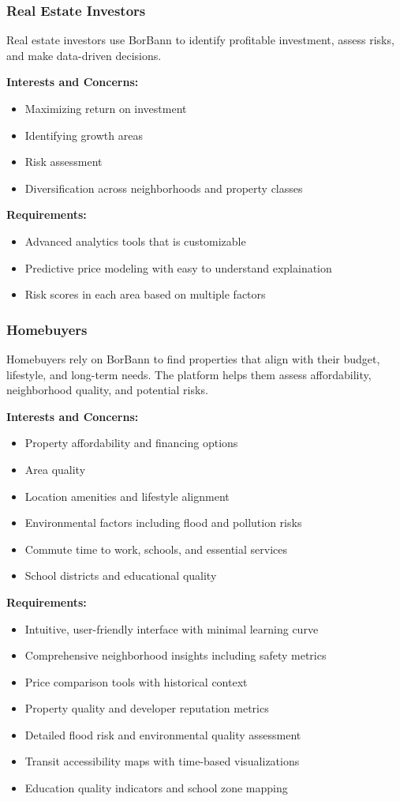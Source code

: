 \subsubsection{Real Estate Investors}
Real estate investors use BorBann to identify profitable investment, assess risks, and make data-driven decisions.

\textbf{Interests and Concerns:}
\begin{itemize}
	\item Maximizing return on investment
	\item Identifying growth areas
	\item Risk assessment
	\item Diversification across neighborhoods and property classes
\end{itemize}

\textbf{Requirements:}
\begin{itemize}
	\item Advanced analytics tools that is customizable
	\item Predictive price modeling with easy to understand explaination
	\item Risk scores in each area based on multiple factors
\end{itemize}

\subsubsection{Homebuyers}
Homebuyers rely on BorBann to find properties that align with their budget, lifestyle, and long-term needs. The platform helps them assess affordability, neighborhood quality, and potential risks.

\textbf{Interests and Concerns:}
\begin{itemize}
	\item Property affordability and financing options
	\item Area quality
	\item Location amenities and lifestyle alignment
	\item Environmental factors including flood and pollution risks
	\item Commute time to work, schools, and essential services
	\item School districts and educational quality
\end{itemize}

\textbf{Requirements:}
\begin{itemize}
	\item Intuitive, user-friendly interface with minimal learning curve
	\item Comprehensive neighborhood insights including safety metrics
	\item Price comparison tools with historical context
	\item Property quality and developer reputation metrics
	\item Detailed flood risk and environmental quality assessment
	\item Transit accessibility maps with time-based visualizations
	\item Education quality indicators and school zone mapping
\end{itemize}

